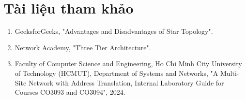 \newpage
\section{Tài liệu tham khảo}
\begin{enumerate}
    \item GeeksforGeeks, "Advantages and Disadvantages of Star Topology".
    \item Network Academy, "Three Tier Architecture".
    \item Faculty of Computer Science and Engineering, Ho Chi Minh City University of Technology (HCMUT), Department of Systems and Networks, "A Multi-Site Network with Address Translation, Internal Laboratory Guide for Courses CO3093 and CO3094", 2024.
\end{enumerate}